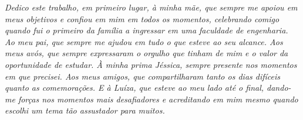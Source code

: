 \begin{dedicatoria}
   \vspace*{\fill}
   \centering
   \noindent
   
   \textit{Dedico este trabalho, em primeiro lugar, à minha mãe, que sempre me apoiou em meus objetivos e confiou em mim em todos os momentos, celebrando comigo quando fui o primeiro da família a ingressar em uma faculdade de engenharia. Ao meu pai, que sempre me ajudou em tudo o que esteve ao seu alcance. Aos meus avós, que sempre expressaram o orgulho que tinham de mim e o valor da oportunidade de estudar. À minha prima Jéssica, sempre presente nos momentos em que precisei. Aos meus amigos, que compartilharam tanto os dias difíceis quanto as comemorações. E à Luíza, que esteve ao meu lado até o final, dando-me forças nos momentos mais desafiadores e acreditando em mim mesmo quando escolhi um tema tão assustador para muitos.} \vspace*{\fill}
   
\end{dedicatoria}